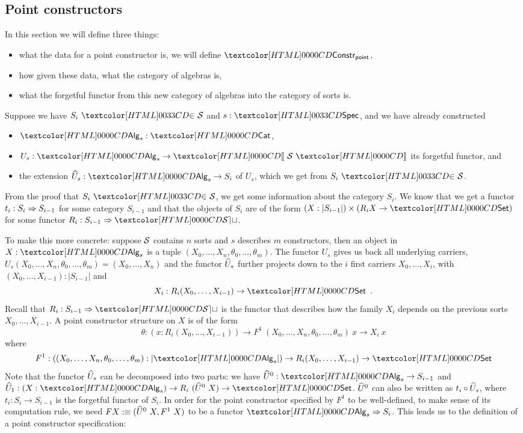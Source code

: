 \subsection{Point constructors}
\label{point-constructors}

In this section we will define three things:
%
\begin{itemize}
\item what the data for a point constructor is, \ie we will define $\Constr_{\ident{point}}$,
\item how given these data, what the category of algebras is,
\item what the forgetful functor from this new category of algebras
  into the category of sorts is.
\end{itemize}
%
Suppose we have $\sortsin{S_i}{\Ss}$ and $s : \specty$, and we have
already constructed
%
\begin{itemize}
\item $\Alg_s : \Cat$,
\item $U_s : \Alg_s \to \SortCat{\Ss}$ its forgetful functor, and
\item the extension $\extendfunc{U}_s : \Alg_s \to S_i$ of $U_s$, which we
  get from $\sortsin{S_i}{\Ss}$.
\end{itemize}
%
From the proof that $\sortsin{S_i}{\Ss}$, we get some information
about the category $S_i$. We know that we get a functor
$t_i : S_i \Rightarrow S_{i-1}$ for some category $S_{i-1}$ and that the
objects of $S_i$ are of the form
$(X : | S_{i-1} |) \times (R_i X \to \Set)$ for some functor
$R_i : \Func{S_{i-1}}{\SET}$.

To make this more concrete: suppose $\mathcal{S}$ contains $n$ sorts and $s$
describes $m$ constructors, then an object in $X : \Alg_s$ is a tuple
$(X_0, \hdots, X_n, \theta_0, \hdots, \theta_m)$. The functor $U_s$
gives us back all underlying carriers, \ie
$U_s(X_0, \hdots, X_n, \theta_0, \hdots, \theta_m) = (X_0, \hdots,
X_n)$
and the functor $\widehat{U}_s$ further projects down to the $i$ first
carriers $X_0, \hdots, X_i$, with
$(X_0, \hdots, X_{i-1}) : | S_{i-1} |$ and
\[
X_i : R_i (X_0, \hdots, X_{i-1}) \to \Set \enspace .
\]
Recall that $R_i : \Func{S_{i-1}}{\SET}$ is the functor that describes how
the family $X_i$ depends on the previous sorts $X_0, \hdots,
X_{i-1}$. A point constructor structure on $X$ is of the form
$$
\theta : (x : R_i (X_0, \hdots, X_{i-1})) \to F^1\ (X_0, \hdots, X_n, \theta_0, \hdots, \theta_m)\ x \to X_i\ x
$$
where
$$
F^1 : ((X_0,\hdots,X_n,\theta_0,\hdots,\theta_m) : | \Alg_s |) \to R_i (X_0, \hdots, X_{i-1}) \to \Set
$$
Note that the functor $\widehat{U}_s$ can be decomposed into two parts: we
have $\extendfunc{U}^0 : \Alg_s \to S_{i-1}$ and
$\extendfunc{U}_1 : (X : \Alg_s) \to R_i\ (\extendfunc{U}^0\ X) \to \Set$.
$\widehat{U}^0$ can also be written as $t_i \circ \widehat{U}_s$, where
$t_i : S_i \to S_{i-1}$ is the forgetful functor of $S_i$. In order
for the point constructor specified by $F^1$ to be well-defined, \ie
to make sense of its computation rule, we need
$F X :\equiv (\widehat{U}^0\ X, F^1\ X)$ to be a functor
$\Func{\Alg_s}{S_i}$.  This leads us to the definition of a point
constructor specification:

